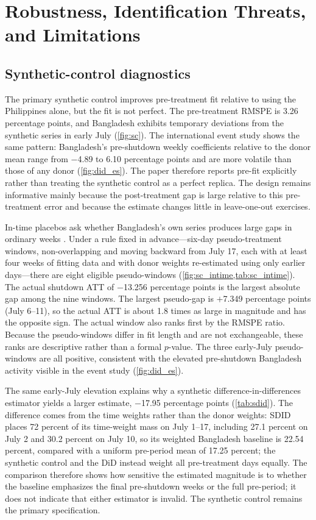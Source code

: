 \section{Robustness, Identification Threats, and Limitations}
\label{sec:robustness}

\subsection{Synthetic-control diagnostics}
\label{sec:sc_diagnostics}

The primary synthetic control improves pre-treatment fit relative to using the Philippines alone, but the fit is not perfect. The pre-treatment RMSPE is 3.26 percentage points, and Bangladesh exhibits temporary deviations from the synthetic series in early July (\cref{fig:sc}). The international event study shows the same pattern: Bangladesh's pre-shutdown weekly coefficients relative to the donor mean range from $-$4.89 to 6.10 percentage points and are more volatile than those of any donor (\cref{fig:did_es}). The paper therefore reports pre-fit explicitly rather than treating the synthetic control as a perfect replica. The design remains informative mainly because the post-treatment gap is large relative to this pre-treatment error and because the estimate changes little in leave-one-out exercises.

In-time placebos ask whether Bangladesh's own series produces large gaps in ordinary weeks \citep{abadie2015}. Under a rule fixed in advance---six-day pseudo-treatment windows, non-overlapping and moving backward from July 17, each with at least four weeks of fitting data and with donor weights re-estimated using only earlier days---there are eight eligible pseudo-windows (\cref{fig:sc_intime,tab:sc_intime}). The actual shutdown ATT of $-$13.256 percentage points is the largest absolute gap among the nine windows. The largest pseudo-gap is $+$7.349 percentage points (July 6--11), so the actual ATT is about 1.8 times as large in magnitude and has the opposite sign. The actual window also ranks first by the RMSPE ratio. Because the pseudo-windows differ in fit length and are not exchangeable, these ranks are descriptive rather than a formal $p$-value. The three early-July pseudo-windows are all positive, consistent with the elevated pre-shutdown Bangladesh activity visible in the event study (\cref{fig:did_es}).

The same early-July elevation explains why a synthetic difference-in-differences estimator \citep{arkhangelsky2021} yields a larger estimate, $-$17.95 percentage points (\cref{tab:sdid}). The difference comes from the time weights rather than the donor weights: SDID places 72 percent of its time-weight mass on July 1--17, including 27.1 percent on July 2 and 30.2 percent on July 10, so its weighted Bangladesh baseline is 22.54 percent, compared with a uniform pre-period mean of 17.25 percent; the synthetic control and the DiD instead weight all pre-treatment days equally. The comparison therefore shows how sensitive the estimated magnitude is to whether the baseline emphasizes the final pre-shutdown weeks or the full pre-period; it does not indicate that either estimator is invalid. The synthetic control remains the primary specification.


